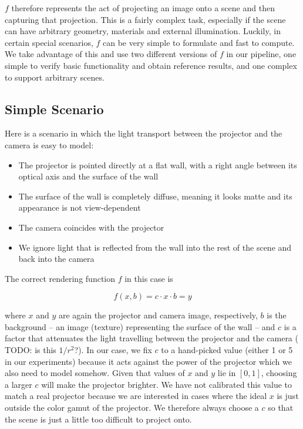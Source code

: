 \(f\) therefore represents the act of projecting an image onto a scene and then capturing that projection. This is a fairly complex task, especially if the scene can have arbitrary geometry, materials and external illumination. Luckily, in certain special scenarios, \(f\) can be very simple to formulate and fast to compute. We take advantage of this and use two different versions of \(f\) in our pipeline, one simple to verify basic functionality and obtain reference results, and one complex to support arbitrary scenes.

\subsection{Simple Scenario}
\label{section:methods-rendering_function-simple}

Here is a scenario in which the light transport between the projector and the camera is easy to model:

\begin{itemize}
    \item The projector is pointed directly at a flat wall, with a right angle between its optical axis and the surface of the wall
    \item The surface of the wall is completely diffuse, meaning it looks matte and its appearance is not view-dependent
    \item The camera coincides with the projector
    \item We ignore light that is reflected from the wall into the rest of the scene and back into the camera
\end{itemize}

The correct rendering function \(f\) in this case is

\begin{equation}
    \label{eq:rendering_function-simple}
    f(x, b) = c \cdot x \cdot b = y
\end{equation}

where \(x\) and \(y\) are again the projector and camera image, respectively, \(b\) is the background -- an image (texture) representing the surface of the wall -- and \(c\) is a factor that attenuates the light travelling between the projector and the camera ({\color{red} TODO: is this \(1/r^2\)?}). In our case, we fix \(c\) to a hand-picked value (either 1 or 5 in our experiments) because it acts against the power of the projector which we also need to model somehow. Given that values of \(x\) and \(y\) lie in \([0, 1]\), choosing a larger \(c\) will make the projector brighter. We have not calibrated this value to match a real projector because we are interested in cases where the ideal \(x\) is just outside the color gamut of the projector. We therefore always choose a \(c\) so that the scene is just a little too difficult to project onto.

